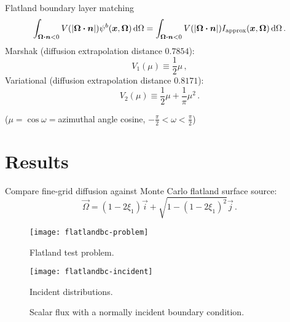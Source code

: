 \documentclass{beamer}
\begin{document}
\begin{frame}{Flatland boundary layer matching}
\begin{equation*}
\int_{\bm{\Omega}\bm{\cdot}\bm{n} < 0} V( \left| \bm{\Omega}\bm{\cdot}\bm{n} \right|)
\psi^b(\bm{x}, \bm{\Omega}) \mathop{}\!\mathrm{d}\Omega
=
\int_{\bm{\Omega}\bm{\cdot}\bm{n} < 0} V( \left| \bm{\Omega}\bm{\cdot}\bm{n} \right|)
I_\text{approx}(\bm{x}, \bm{\Omega}) \mathop{}\!\mathrm{d}\Omega \,.
\end{equation*}
Marshak (diffusion extrapolation distance $0.7854$):
\begin{equation*}
  V_1(\mu) \equiv \frac{1}{2} \mu \,,
\end{equation*}
Variational (diffusion extrapolation distance $0.8171$):
\begin{equation*}
  V_2(\mu) \equiv \frac{1}{2} \mu + \frac{1}{\pi}\mu^2 \,.
\end{equation*}

($\mu=\cos\omega={}$azimuthal angle cosine, $-\frac{\pi}{2} < \omega <
\frac{\pi}{2}$)
\end{frame}

\section{Results}
\begin{frame}
Compare fine-grid diffusion against Monte Carlo flatland surface source:
\begin{equation*}
  \vec{\Omega} = (1 - 2\xi_1) \vec{i} + \sqrt{1 - (1 - 2\xi_1)^2} \vec{j}\,.
\end{equation*}

\begin{figure}[tb]
  \texttt{[image: flatlandbc-problem]}

  \caption{Flatland test problem.}
  \label{fig:problem}
\end{figure}

\begin{figure}[tb]
  \centering\vspace{-.5in}%
  \texttt{[image: flatlandbc-incident]}

  \caption{Incident distributions.}
  \label{fig:distributions}
\end{figure}

\end{frame}

\begin{frame}
\begin{figure}[tb]
  \centering
  \hspace{-.5in}
  
  \hspace{-.5in}
  \caption{Scalar flux with a normally incident boundary condition.}
  \label{fig:delta}
\end{figure}
\end{frame}
\end{document}
